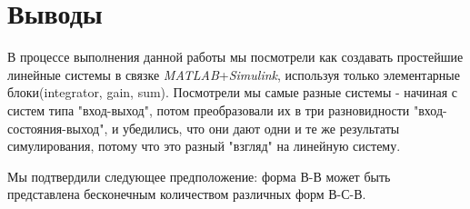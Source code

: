 \chapter{Выводы}
\label{ch:chap5}

В процессе выполнения данной работы мы посмотрели как создавать простейшие линейные системы в связке \textit{MATLAB}+\textit{Simulink}, используя только элементарные блоки(integrator, gain, sum). Посмотрели мы самые разные системы - начиная с 
систем типа "вход-выход", потом преобразовали их в три разновидности "вход-состояния-выход", и убедились, что они дают одни и те же результаты симулирования, 
потому что это разный "взгляд" на линейную систему.

Мы подтвердили следующее предположение: форма В-В может быть представлена бесконечным количеством различных форм В-С-В.

\endinput